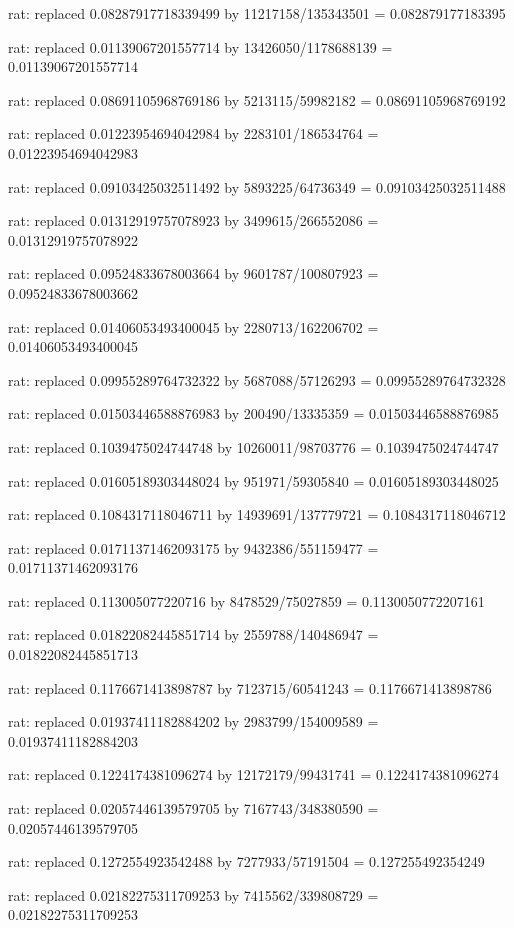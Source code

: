 \documentclass[a4paper,10pt]{article}
\begin{document}
\begin{eulernotebook}
\begin{eulercomment}
\begin{eulercomment}
\begin{eulercomment}
\begin{eulercomment}
\begin{eulercomment}
\begin{eulercomment}
\begin{eulercomment}
\begin{eulercomment}
\begin{eulercomment}
\begin{eulercomment}
\begin{eulercomment}
\begin{eulercomment}
\begin{eulercomment}
\begin{eulercomment}
\begin{eulercomment}
\begin{eulercomment}
\begin{euleroutput}
  rat: replaced 0.08287917718339499 by 11217158/135343501 = 0.082879177183395
  
  rat: replaced 0.01139067201557714 by 13426050/1178688139 = 0.01139067201557714
  
  rat: replaced 0.08691105968769186 by 5213115/59982182 = 0.08691105968769192
  
  rat: replaced 0.01223954694042984 by 2283101/186534764 = 0.01223954694042983
  
  rat: replaced 0.09103425032511492 by 5893225/64736349 = 0.09103425032511488
  
  rat: replaced 0.01312919757078923 by 3499615/266552086 = 0.01312919757078922
  
  rat: replaced 0.09524833678003664 by 9601787/100807923 = 0.09524833678003662
  
  rat: replaced 0.01406053493400045 by 2280713/162206702 = 0.01406053493400045
  
  rat: replaced 0.09955289764732322 by 5687088/57126293 = 0.09955289764732328
  
  rat: replaced 0.01503446588876983 by 200490/13335359 = 0.01503446588876985
  
  rat: replaced 0.1039475024744748 by 10260011/98703776 = 0.1039475024744747
  
  rat: replaced 0.01605189303448024 by 951971/59305840 = 0.01605189303448025
  
  rat: replaced 0.1084317118046711 by 14939691/137779721 = 0.1084317118046712
  
  rat: replaced 0.01711371462093175 by 9432386/551159477 = 0.01711371462093176
  
  rat: replaced 0.113005077220716 by 8478529/75027859 = 0.1130050772207161
  
  rat: replaced 0.01822082445851714 by 2559788/140486947 = 0.01822082445851713
  
  rat: replaced 0.1176671413898787 by 7123715/60541243 = 0.1176671413898786
  
  rat: replaced 0.01937411182884202 by 2983799/154009589 = 0.01937411182884203
  
  rat: replaced 0.1224174381096274 by 12172179/99431741 = 0.1224174381096274
  
  rat: replaced 0.02057446139579705 by 7167743/348380590 = 0.02057446139579705
  
  rat: replaced 0.1272554923542488 by 7277933/57191504 = 0.127255492354249
  
  rat: replaced 0.02182275311709253 by 7415562/339808729 = 0.02182275311709253
  

\end{euleroutput}
\end{eulercomment}
\end{eulercomment}
\end{eulercomment}
\end{eulercomment}
\end{eulercomment}
\end{eulercomment}
\end{eulercomment}
\end{eulercomment}
\end{eulercomment}
\end{eulercomment}
\end{eulercomment}
\end{eulercomment}
\end{eulercomment}
\end{eulercomment}
\end{eulercomment}
\end{eulercomment}
\end{eulernotebook}
\end{document}
